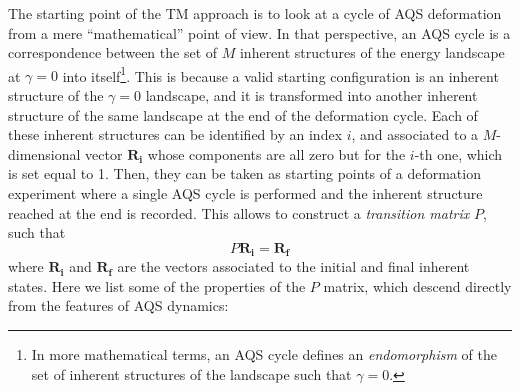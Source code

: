 The starting point of the TM approach is to look at a cycle of AQS deformation from a mere ``mathematical'' point of view.
In that perspective, an AQS cycle is a correspondence between the set of $M$ inherent structures of the energy landscape at $\gamma = 0$ into itself\footnote{In more mathematical terms, an AQS cycle defines an \emph{endomorphism} of the set of inherent structures of the landscape such that $\gamma = 0$.}. This is because a valid starting configuration is an inherent structure of the $\gamma = 0$ landscape, and it is transformed into another inherent structure of the same landscape at the end of the deformation cycle. Each of these inherent structures can be identified by an index $i$, and associated to a $M$-dimensional vector $\mathbf{R_{i}}$ whose components are all zero but for the $i$-th one, which is set equal to 1. Then, they can be taken as starting points of a deformation experiment where a single AQS cycle is performed and the inherent structure reached at the end is recorded.
This allows to construct a \emph{transition matrix} $P$, such that
\begin{equation}
	P \mathbf{R_{i}} = \mathbf{R_{f}}
	\label{eq:TransitionMatrixCycle}
\end{equation}
where $\mathbf{R_{i}}$ and $\mathbf{R_{f}}$ are the vectors associated to the initial and final inherent states.
Here we list some of the properties of the $P$ matrix, which descend directly from the features of AQS dynamics:
